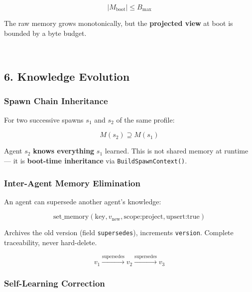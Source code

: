 \documentclass[11pt]{article}
\begin{document}
\[|M_{\text{boot}}| \leq B_{\max}\]

The raw memory grows monotonically, but the \textbf{projected view} at
boot is bounded by a byte budget.

    \begin{center}
    \end{center}
    { \hspace*{\fill} \\}
    
    \subsection{6. Knowledge Evolution}\label{knowledge-evolution}

\subsubsection{Spawn Chain Inheritance}\label{spawn-chain-inheritance}

For two successive spawns \(s_1\) and \(s_2\) of the same profile:

\[M(s_2) \supseteq M(s_1)\]

Agent \(s_2\) \textbf{knows everything} \(s_1\) learned. This is not
shared memory at runtime --- it is \textbf{boot-time inheritance} via
\texttt{BuildSpawnContext()}.

\subsubsection{Inter-Agent Memory
Elimination}\label{inter-agent-memory-elimination}

An agent can supersede another agent's knowledge:

\[\text{set\_memory}(\text{key}, v_{\text{new}}, \text{scope:project}, \text{upsert:true})\]

Archives the old version (field \texttt{supersedes}), increments
\texttt{version}. Complete traceability, never hard-delete.

\[v_1 \xrightarrow{\text{supersedes}} v_2 \xrightarrow{\text{supersedes}} v_3\]

\subsubsection{Self-Learning Correction}\label{self-learning-correction}
\end{document}
